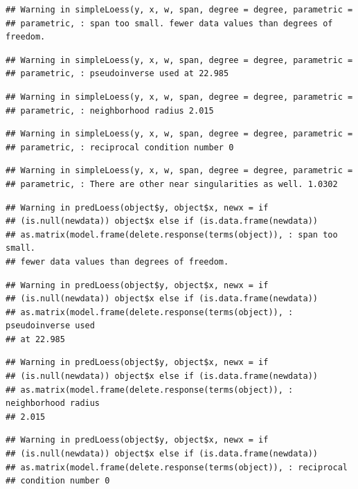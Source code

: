 \documentclass[]{book}
\theoremstyle{definition}
\theoremstyle{definition}
\theoremstyle{definition}
\theoremstyle{remark}
\begin{document}
\begin{enumerate}
\begin{verbatim}
## Warning in simpleLoess(y, x, w, span, degree = degree, parametric =
## parametric, : span too small. fewer data values than degrees of freedom.
\end{verbatim}

\begin{verbatim}
## Warning in simpleLoess(y, x, w, span, degree = degree, parametric =
## parametric, : pseudoinverse used at 22.985
\end{verbatim}

\begin{verbatim}
## Warning in simpleLoess(y, x, w, span, degree = degree, parametric =
## parametric, : neighborhood radius 2.015
\end{verbatim}

\begin{verbatim}
## Warning in simpleLoess(y, x, w, span, degree = degree, parametric =
## parametric, : reciprocal condition number 0
\end{verbatim}

\begin{verbatim}
## Warning in simpleLoess(y, x, w, span, degree = degree, parametric =
## parametric, : There are other near singularities as well. 1.0302
\end{verbatim}

\begin{verbatim}
## Warning in predLoess(object$y, object$x, newx = if
## (is.null(newdata)) object$x else if (is.data.frame(newdata))
## as.matrix(model.frame(delete.response(terms(object)), : span too small.
## fewer data values than degrees of freedom.
\end{verbatim}

\begin{verbatim}
## Warning in predLoess(object$y, object$x, newx = if
## (is.null(newdata)) object$x else if (is.data.frame(newdata))
## as.matrix(model.frame(delete.response(terms(object)), : pseudoinverse used
## at 22.985
\end{verbatim}

\begin{verbatim}
## Warning in predLoess(object$y, object$x, newx = if
## (is.null(newdata)) object$x else if (is.data.frame(newdata))
## as.matrix(model.frame(delete.response(terms(object)), : neighborhood radius
## 2.015
\end{verbatim}

\begin{verbatim}
## Warning in predLoess(object$y, object$x, newx = if
## (is.null(newdata)) object$x else if (is.data.frame(newdata))
## as.matrix(model.frame(delete.response(terms(object)), : reciprocal
## condition number 0
\end{verbatim}


\end{enumerate}
\end{document}

